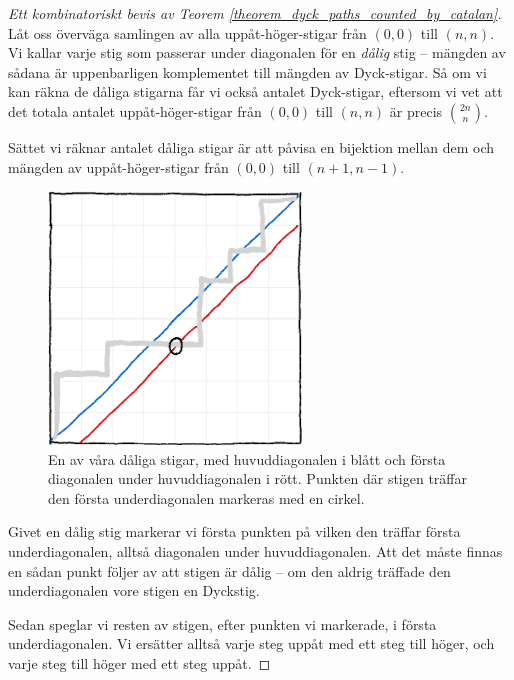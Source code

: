 \documentclass{tufte-handout}
\begin{document}
\begin{proof}[Ett kombinatoriskt bevis av Teorem \ref{theorem_dyck_paths_counted_by_catalan}]
    Låt oss överväga samlingen av alla uppåt-höger-stigar från $(0,0)$ till $(n,n)$. Vi kallar varje stig som passerar under diagonalen för en \emph{dålig} stig -- mängden av sådana är uppenbarligen komplementet till mängden av Dyck-stigar. Så om vi kan räkna de dåliga stigarna får vi också antalet Dyck-stigar, eftersom vi vet att det totala antalet uppåt-höger-stigar från $(0,0)$ till $(n,n)$ är precis $\binom{2n}{n}$.

    Sättet vi räknar antalet dåliga stigar är att påvisa en bijektion mellan dem och mängden av uppåt-höger-stigar från $(0,0)$ till $(n+1,n-1)$.

    \begin{figure}\label{fig:dyck_comb_proof_path}
        \centering
        \includegraphics[width=0.6\textwidth]{graphics/dyck_combinatorial_proof_path.png}
        \caption{En av våra dåliga stigar, med huvuddiagonalen i blått och första diagonalen under huvuddiagonalen i rött. Punkten där stigen träffar den första underdiagonalen markeras med en cirkel.}
    \end{figure}

    Givet en dålig stig markerar vi första punkten på vilken den träffar första underdiagonalen, alltså diagonalen under huvuddiagonalen. Att det måste finnas en sådan punkt följer av att stigen är dålig -- om den aldrig träffade den underdiagonalen vore stigen en Dyckstig.

    Sedan speglar vi resten av stigen, efter punkten vi markerade, i första underdiagonalen. Vi ersätter alltså varje steg uppåt med ett steg till höger, och varje steg till höger med ett steg uppåt. 


\end{proof}
\end{document}
